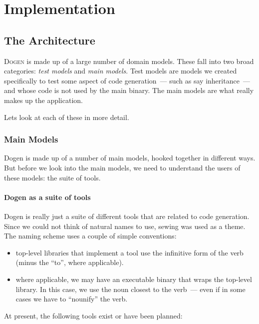 \documentclass{book}
\begin{document}
\part{Implementation}

\chapter{The Architecture}

\lettrine{D}{ogen} is made up of a large number of domain
models. These fall into two broad categories: \emph{test models} and
\emph{main models}. Test models are models we created specifically to
test some aspect of code generation~--- such as say inheritance~---
and whose code is not used by the main binary. The main models are
what really makes up the application.

Lets look at each of these in more detail.

\section{Main Models}

Dogen is made up of a number of main models, hooked together in
different ways. But before we look into the main models, we need to
understand the users of these models: the suite of tools.

\subsection{Dogen as a suite of tools}

Dogen is really just a suite of different tools that are related to
code generation. Since we could not think of natural names to use,
sewing was used as a theme. The naming scheme uses a couple of simple
conventions:

\begin{itemize}
\item top-level libraries that implement a tool use the infinitive
  form of the verb (minus the ``to'', where applicable).
\item where applicable, we may have an executable binary that wraps
  the top-level library. In this case, we use the noun closest to the
  verb~--- even if in some cases we have to ``nounify'' the verb.
\end{itemize}

At present, the following tools exist or have been planned:
\end{document}

